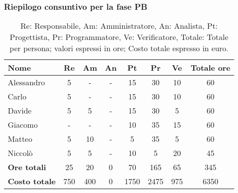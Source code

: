 \subsubsection{Riepilogo consuntivo per la fase PB}
\begin{table}[H]
	\centering
	\begin{tabular}{l|c|c|c|c|c|c|c}
		\textbf{Nome}         & \textbf{Re} & \textbf{Am} & \textbf{An} & \textbf{Pt} & \textbf{Pr} & \textbf{Ve} & \textbf{Totale ore} \\
		\hline
		Alessandro            & 5           & -           & -           & 15          & 30          & 10          & 60                  \\
		Carlo                 & 5           & -           & -           & 15          & 30          & 10          & 60                  \\
		Davide                & 5           & 5           & -           & 15          & 30          & 5           & 60                  \\
		Giacomo               & -           & -           & -           & 10          & 35          & 15          & 60                  \\
		Matteo                & 5           & 10          & -           & 5           & 35          & 5           & 60                  \\
		Niccolò               & 5           & 5           & -           & 10          & 5           & 20          & 45                  \\
		\hline
		\textbf{Ore totali}   & 25          & 20          & 0           & 70          & 165         & 65          & 345                 \\
		\textbf{Costo totale} & 750         & 400         & 0           & 1750        & 2475        & 975         & 6350
	\end{tabular}
	\caption{Re: Responsabile, Am: Amministratore, An: Analista, Pt: Progettista, Pr: Programmatore, Ve: Verificatore, Totale: Totale per persona; valori espressi in ore; Costo totale espresso in euro.}
\end{table}


